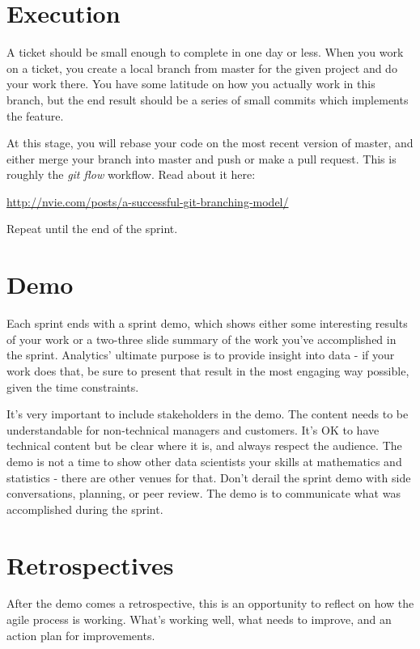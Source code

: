 \documentclass[
  11pt,
]{book}
\begin{document}
\hypertarget{execution}{%
\section{Execution}\label{execution}}

A ticket should be small enough to complete in one day or less. When you work on a ticket, you create a local branch from master for the given project and do your work there. You have some latitude on how you actually work in this branch, but the end result should be a series of small commits which implements the feature.

At this stage, you will rebase your code on the most recent version of master, and either merge your branch into master and push or make a pull request.
This is roughly the \emph{git flow} workflow. Read about it here:

\url{http://nvie.com/posts/a-successful-git-branching-model/}

Repeat until the end of the sprint.

\hypertarget{demo}{%
\section{Demo}\label{demo}}

Each sprint ends with a sprint demo, which shows either some interesting results of your work or a two-three slide summary of the work you've accomplished in the sprint. Analytics' ultimate purpose is to provide insight into data - if your work does that, be sure to present that result in the most engaging way possible, given the time constraints.

It's very important to include stakeholders in the demo. The content needs to be understandable for non-technical managers and customers. It's OK to have technical content but be clear where it is, and always respect the audience. The demo is not a time to show other data scientists your skills at mathematics and statistics - there are other venues for that. Don't derail the sprint demo with side conversations, planning, or peer review. The demo is to communicate what was accomplished during the sprint.

\hypertarget{retrospectives}{%
\section{Retrospectives}\label{retrospectives}}

After the demo comes a retrospective, this is an opportunity to reflect on how the agile process is working. What's working well, what needs to improve, and an action plan for improvements.
\end{document}
